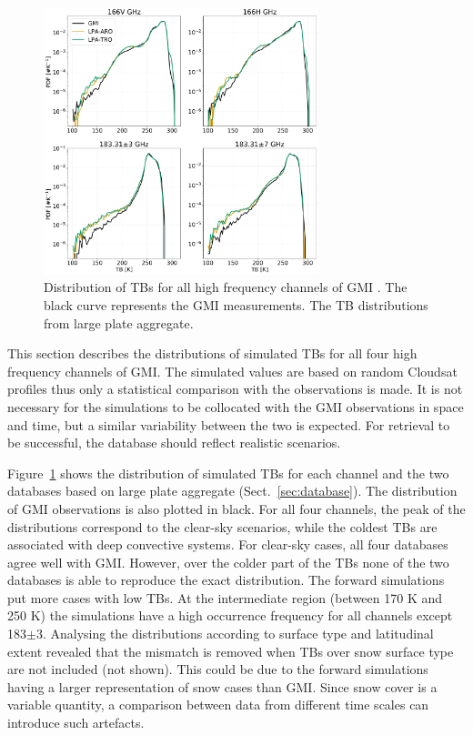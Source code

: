 \documentclass[amt, manuscript]{copernicus}
\begin{document}
\begin{figure}[t]
	\includegraphics[width=8cm]{Figures/PDF_TB_jan.pdf}
	\caption{Distribution of TBs for all high frequency channels of GMI . The black curve represents the GMI measurements. The TB distributions from large plate aggregate.}
	\label{fig:hist_TB}
\end{figure}


This section describes the distributions of simulated TBs for all four high frequency channels of GMI. The simulated values are based on random Cloudsat profiles thus only a statistical comparison with the observations is made. It is not necessary for the simulations to be collocated with the GMI observations in space and time, but a similar variability between the two is expected. For retrieval to be successful, the database should reflect realistic scenarios. 

Figure~\ref{fig:hist_TB} shows the distribution of simulated TBs for each channel and the two databases based on large plate aggregate (Sect.~\ref{sec:database}). The distribution of GMI observations is also plotted in black. For all four channels, the peak of the distributions correspond to the clear-sky scenarios, while the coldest TBs are associated with deep convective systems. For clear-sky cases, all four databases agree well with GMI. However, over the colder part of the TBs none of the two databases is able to reproduce the exact distribution. The forward simulations put more cases with low TBs. At the intermediate region (between 170\,\,K and 250\,\,K) the simulations have a high occurrence frequency for all channels except 183$\pm$3. Analysing the distributions according to surface type and latitudinal extent revealed that the mismatch is removed when TBs over snow surface type are not included (not shown). This could be due to the forward simulations having a larger representation of snow cases than GMI. Since snow cover is a variable quantity, a comparison between data from different time scales can introduce such artefacts. 
\end{document}
